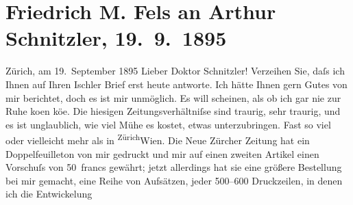 

               \section[Friedrich M. Fels an Arthur Schnitzler, 19. 9. 1895]{ Friedrich M. Fels an Arthur Schnitzler, 19. 9. 1895}\nopagebreak{}\rehead{ }\begin{ledgroupsized}[t]{13cm}\normalsize\beginnumbering{} \toendnotes[C]{\smallbreak\pagebreak[2]} 
\toendnotes[C]{\smallbreak}\pstart
           \raggedleft{}{\pb}Zürich, am 19. September 1895\pend
           \pstart\center{}Lieber Doktor Schnitzler!\pend\pstart
           Verzeihen Sie, daſs ich Ihnen auf Ihren Ischler
                    Brief erst heute antworte. Ich hätte Ihnen gern Gutes von mir berichtet, doch es
                    ist mir unmöglich. Es will scheinen, als ob ich gar nie zur Ruhe ko{\geminationm}en kö{\geminationn}e. Die
                    hiesigen Zeitungsverhältniſse sind traurig, sehr traurig, und es ist
                    unglaublich, wie viel Mühe es kostet, etwas unterzubringen. Fast so viel oder
                    vielleicht mehr als in \substVorne{}\textsuperscript{Zürich}{\allowbreak}\substDazwischen{}Wien\substHinten{}. Die Neue Zürcher Zeitung hat ein Doppelfeuilleton von mir
                    gedruckt und mir auf einen zweiten Artikel einen Vorschuſs von 50 francs
                    gewährt; jetzt allerdings hat sie eine größere Bestellung bei mir gemacht, eine
                    Reihe von Aufsätzen, jeder 500–600 Druckzeilen, in denen ich die Entwickelung

\end{ledgroupsized}
